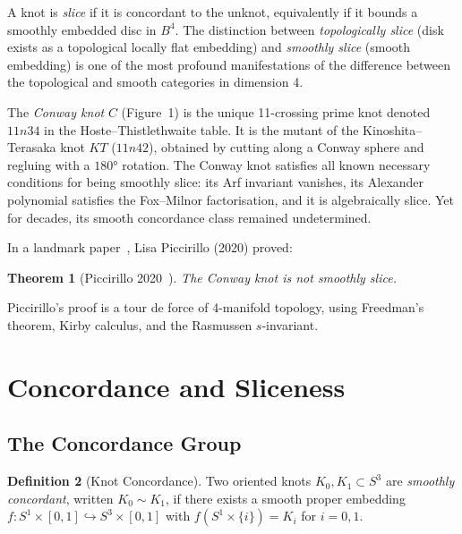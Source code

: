 \documentclass[12pt,a4paper]{amsart}
\newtheorem{theorem}{Theorem}[section]
\theoremstyle{definition}
\newtheorem{definition}[theorem]{Definition}
\theoremstyle{remark}
\begin{document}
A knot is \emph{slice} if it is concordant to the unknot, equivalently if
it bounds a smoothly embedded disc in $B^4$. The distinction between
\emph{topologically slice} (disk exists as a topological locally flat embedding)
and \emph{smoothly slice} (smooth embedding) is one of the most profound
manifestations of the difference between the topological and smooth
categories in dimension 4.

The \emph{Conway knot} $C$ (Figure~1) is the unique 11-crossing prime knot
denoted $11n34$ in the Hoste--Thistlethwaite table. It is the mutant
of the Kinoshita--Terasaka knot $KT$ ($11n42$), obtained by cutting along
a Conway sphere and regluing with a $180°$ rotation. The Conway knot
satisfies all known necessary conditions for being smoothly slice: its
Arf invariant vanishes, its Alexander polynomial satisfies the Fox--Milnor
factorisation, and it is algebraically slice. Yet for decades, its smooth
concordance class remained undetermined.

In a landmark paper~\cite{Piccirillo2020}, Lisa Piccirillo (2020) proved:

\begin{theorem}[Piccirillo 2020~\cite{Piccirillo2020}]
\label{thm:Piccirillo}
The Conway knot is not smoothly slice.
\end{theorem}

Piccirillo's proof is a tour de force of 4-manifold topology, using
Freedman's theorem, Kirby calculus, and the Rasmussen $s$-invariant.

\section{Concordance and Sliceness}

\subsection{The Concordance Group}

\begin{definition}[Knot Concordance]
Two oriented knots $K_0, K_1 \subset S^3$ are \emph{smoothly concordant},
written $K_0 \sim K_1$, if there exists a smooth proper embedding
$f \colon S^1 \times [0,1] \hookrightarrow S^3 \times [0,1]$
with $f(S^1 \times \{i\}) = K_i$ for $i = 0, 1$.
\end{definition}
\end{document}

